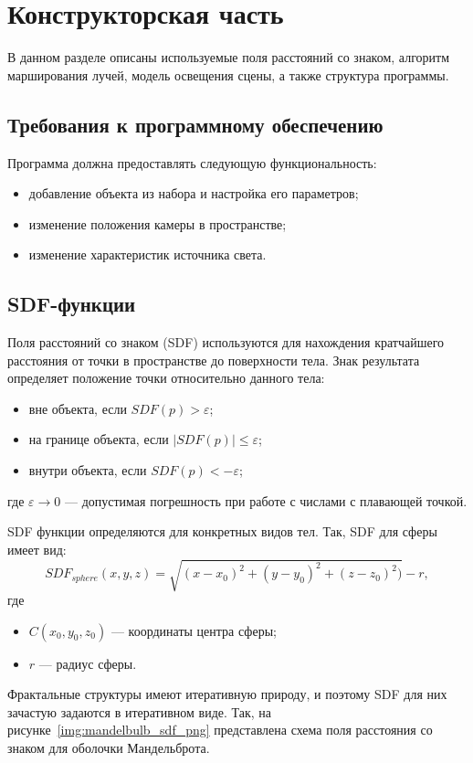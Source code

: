 \section{Конструкторская часть}

В данном разделе описаны используемые поля расстояний со знаком, алгоритм марширования лучей, модель освещения сцены, а также структура программы.

\subsection{Требования к программному обеспечению}

Программа должна предоставлять следующую функциональность:

\begin{itemize}
	\item добавление объекта из набора и настройка его параметров;
	\item изменение положения камеры в пространстве;
	\item изменение характеристик источника света.
\end{itemize}

\subsection{SDF-функции}

Поля расстояний со знаком (SDF) используются для нахождения кратчайшего расстояния
от точки в пространстве до поверхности тела. Знак результата определяет положение точки относительно данного тела:

\begin{itemize}
  \item вне объекта, если $SDF(p) > \varepsilon$;
  \item на границе объекта, если $|SDF(p)| \le \varepsilon$;
  \item внутри объекта, если $SDF(p) < -\varepsilon$;
\end{itemize}
где $\varepsilon \rightarrow 0$ --- допустимая погрешность при работе с числами с плавающей точкой.

SDF функции определяются для конкретных видов тел. Так, SDF для сферы имеет вид:
\begin{equation}
  SDF_{sphere}(x, y, z) = \sqrt{(x - x_0) ^ 2 + (y - y_0) ^ 2 + (z - z_0) ^ 2)} - r,
  \label{eq:sdf_sphere}
\end{equation}
где
\begin{itemize}
  \item $C(x_0, y_0, z_0)$ --- координаты центра сферы;
  \item $r$ --- радиус сферы.
\end{itemize}
Фрактальные структуры имеют итеративную природу, и поэтому SDF для них зачастую задаются в итеративном виде. Так, на рисунке~\ref{img:mandelbulb_sdf_png}
представлена схема поля расстояния со знаком для оболочки Мандельброта.

